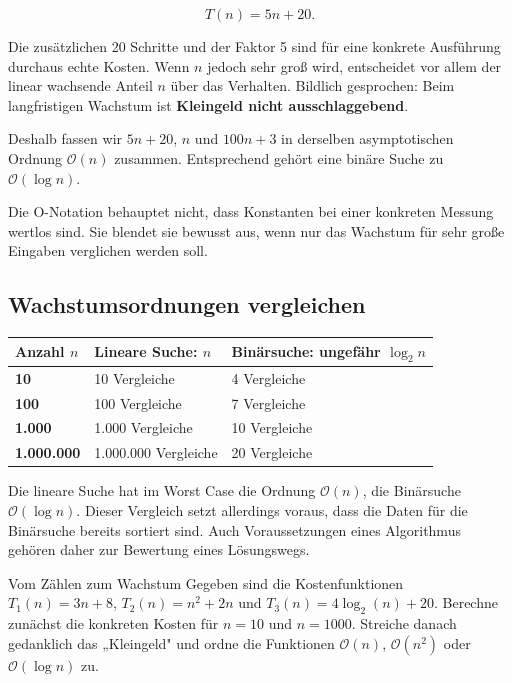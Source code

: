 \documentclass{article}
\begin{document}
\[
T(n)=5n+20.
\]

Die zusätzlichen 20 Schritte und der Faktor 5 sind für eine konkrete Ausführung durchaus echte Kosten. Wenn \(n\) jedoch sehr groß wird, entscheidet vor allem der linear wachsende Anteil \(n\) über das Verhalten. Bildlich gesprochen: Beim langfristigen Wachstum ist \textbf{Kleingeld nicht ausschlaggebend}.

Deshalb fassen wir \(5n+20\), \(n\) und \(100n+3\) in derselben asymptotischen Ordnung \(\mathcal{O}(n)\) zusammen. Entsprechend gehört eine binäre Suche zu \(\mathcal{O}(\log n)\).

\begin{merksatz}
Die O-Notation behauptet nicht, dass Konstanten bei einer konkreten Messung wertlos sind. Sie blendet sie bewusst aus, wenn nur das Wachstum für sehr große Eingaben verglichen werden soll.
\end{merksatz}

\subsection{Wachstumsordnungen vergleichen}

\begin{center}
\begin{tabularx}{0.8\textwidth}{|>{\bfseries}l|X|X|}
\hline
Anzahl \(n\) & Lineare Suche: \(n\) & Binärsuche: ungefähr \(\log_2 n\) \\
\hline
10 & 10 Vergleiche & 4 Vergleiche \\
100 & 100 Vergleiche & 7 Vergleiche \\
1.000 & 1.000 Vergleiche & 10 Vergleiche \\
1.000.000 & 1.000.000 Vergleiche & 20 Vergleiche \\
\hline
\end{tabularx}
\end{center}

Die lineare Suche hat im Worst Case die Ordnung \(\mathcal{O}(n)\), die Binärsuche \(\mathcal{O}(\log n)\). Dieser Vergleich setzt allerdings voraus, dass die Daten für die Binärsuche bereits sortiert sind. Auch Voraussetzungen eines Algorithmus gehören daher zur Bewertung eines Lösungswegs.

\begin{uebung}{Vom Zählen zum Wachstum}
Gegeben sind die Kostenfunktionen \(T_1(n)=3n+8\), \(T_2(n)=n^2+2n\) und \(T_3(n)=4\log_2(n)+20\). Berechne zunächst die konkreten Kosten für \(n=10\) und \(n=1000\). Streiche danach gedanklich das „Kleingeld" und ordne die Funktionen \(\mathcal{O}(n)\), \(\mathcal{O}(n^2)\) oder \(\mathcal{O}(\log n)\) zu.
\end{uebung}
\end{document}
